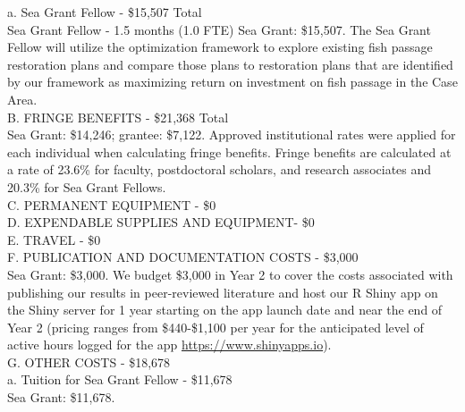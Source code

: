 \documentclass[12pt]{elsarticle}
\begin{document}
a. Sea Grant Fellow -  \$15,507 Total\\

Sea Grant Fellow - 1.5 months (1.0 FTE) Sea Grant:  \$15,507. The Sea Grant Fellow will utilize the optimization framework to explore existing fish passage restoration plans and compare those plans to restoration plans that are identified by our framework as maximizing return on investment on fish passage in the Case Area. \\


B. FRINGE BENEFITS - \$21,368 Total\\

Sea Grant: \$14,246; grantee: \$7,122. Approved institutional rates were applied for each individual when calculating fringe benefits. Fringe benefits are calculated at a rate of 23.6\% for faculty, postdoctoral scholars, and research associates and 20.3\% for Sea Grant Fellows.\\

C. PERMANENT EQUIPMENT - \$0\\

D. EXPENDABLE SUPPLIES AND EQUIPMENT- \$0\\

E. TRAVEL - \$0 \\

F. PUBLICATION AND DOCUMENTATION COSTS - \$3,000\\
Sea Grant: \$3,000. We budget \$3,000 in Year 2 to cover the costs associated with publishing our results in peer-reviewed literature and host our R Shiny app on the Shiny server for 1 year starting on the app launch date and near the end of Year 2 (pricing ranges from \$440-\$1,100 per year for the anticipated level of active hours logged for the app \url{https://www.shinyapps.io}).\\

G. OTHER COSTS - \$18,678 \\

a. Tuition for Sea Grant Fellow - \$11,678 \\
Sea Grant: \$11,678.\\
\end{document}
